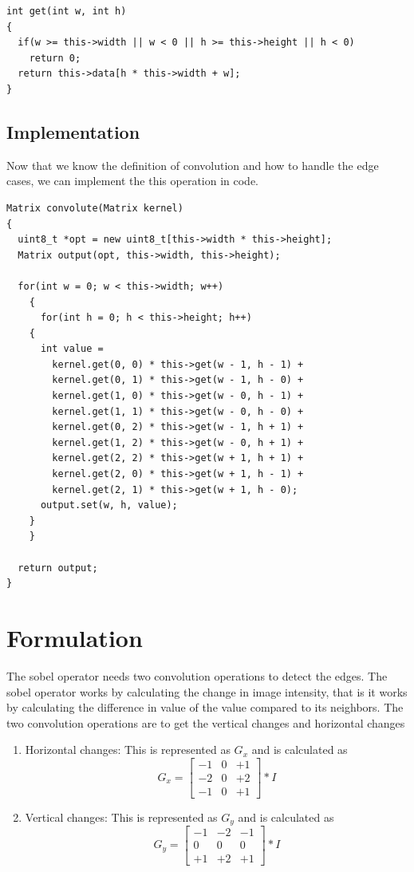\documentclass[a4paper,oneside,12pt]{report}
\begin{document}
\begin{verbatim}
int get(int w, int h)
{
  if(w >= this->width || w < 0 || h >= this->height || h < 0)
    return 0;
  return this->data[h * this->width + w];
}
\end{verbatim}

\subsection{Implementation}
\label{sec:org6eb35db}
Now that we know the definition of convolution and how to handle the edge cases, we can implement the this operation in code.
\begin{verbatim}
Matrix convolute(Matrix kernel)
{
  uint8_t *opt = new uint8_t[this->width * this->height];
  Matrix output(opt, this->width, this->height);

  for(int w = 0; w < this->width; w++)
    {
      for(int h = 0; h < this->height; h++)
	{
	  int value =
	    kernel.get(0, 0) * this->get(w - 1, h - 1) +
	    kernel.get(0, 1) * this->get(w - 1, h - 0) +
	    kernel.get(1, 0) * this->get(w - 0, h - 1) +
	    kernel.get(1, 1) * this->get(w - 0, h - 0) +
	    kernel.get(0, 2) * this->get(w - 1, h + 1) +
	    kernel.get(1, 2) * this->get(w - 0, h + 1) +
	    kernel.get(2, 2) * this->get(w + 1, h + 1) +
	    kernel.get(2, 0) * this->get(w + 1, h - 1) +
	    kernel.get(2, 1) * this->get(w + 1, h - 0);
	  output.set(w, h, value);
	}
    }

  return output;
}
\end{verbatim}

\section{Formulation}
\label{sec:orgf9c6f85}
The sobel operator needs two convolution operations to detect the edges. The sobel operator works by calculating the change in image intensity, that is it works by calculating the difference in value of the value compared to its neighbors. The two convolution operations are to get the vertical changes and horizontal changes
\begin{enumerate}
\item Horizontal changes: This is represented as \(G_x\) and is calculated as
\[ G_x = \begin{bmatrix} -1 & 0 & +1\\ -2 & 0 & +2\\ -1 & 0 & +1 \end{bmatrix} \ast I \]
\item Vertical changes: This is represented as \(G_y\) and is calculated as
\[ G_y = \begin{bmatrix} -1 & -2 & -1\\ 0 & 0 & 0\\ +1 & +2 & +1 \end{bmatrix} \ast I \]
\end{enumerate}
\end{document}
